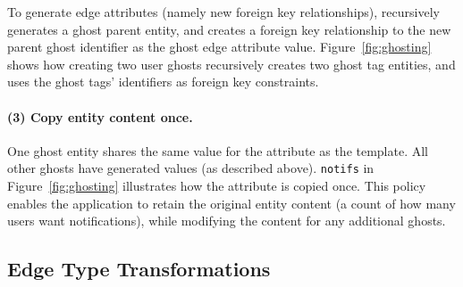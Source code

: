         To generate edge attributes (namely new foreign key relationships), \sys recursively
        generates a ghost parent entity, and creates a foreign key relationship to the new parent
        ghost identifier as the ghost edge attribute value.  Figure~\ref{fig:ghosting}
        shows how creating two user ghosts recursively creates two ghost tag entities, and uses
        the ghost tags' identifiers as foreign key constraints.

\paragraph{(3) Copy entity content once.} One ghost entity shares the same value for the attribute as the
        template. All other ghosts have generated values (as described above).
        \texttt{notifs} in Figure~\ref{fig:ghosting} illustrates how the attribute is copied 
        once. This policy enables the application to retain the original entity content (\eg a count
        of how many users want notifications), while modifying the content for any additional
        ghosts.

\subsection{Edge Type Transformations}
\label{design:edgepol}

